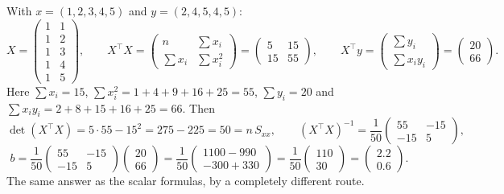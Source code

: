 \documentclass[11pt]{article}
\begin{document}
\begin{worked}
With $x = (1,2,3,4,5)$ and $y = (2,4,5,4,5)$:
\[
  X = \begin{pmatrix}1&1\\1&2\\1&3\\1&4\\1&5\end{pmatrix},\qquad
  X^{\!\top}\!X = \begin{pmatrix} n & \sum x_i\\ \sum x_i & \sum x_i^2
    \end{pmatrix} = \begin{pmatrix}5 & 15\\ 15 & 55\end{pmatrix},\qquad
  X^{\!\top}y = \begin{pmatrix}\sum y_i\\ \sum x_iy_i\end{pmatrix}
    = \begin{pmatrix}20\\ 66\end{pmatrix}.
\]
Here $\sum x_i = 15$, $\sum x_i^2 = 1+4+9+16+25 = 55$, $\sum y_i = 20$ and
$\sum x_iy_i = 2+8+15+16+25 = 66$. Then
\[
  \det(X^{\!\top}\!X) = 5\cdot55 - 15^2 = 275 - 225 = 50 = n\,S_{xx},
  \qquad
  (X^{\!\top}\!X)^{-1} = \frac{1}{50}\begin{pmatrix}55 & -15\\ -15 & 5
    \end{pmatrix},
\]
\[
  b = \frac{1}{50}\begin{pmatrix}55 & -15\\ -15 & 5\end{pmatrix}
      \begin{pmatrix}20\\66\end{pmatrix}
    = \frac{1}{50}\begin{pmatrix}1100 - 990\\ -300 + 330\end{pmatrix}
    = \frac{1}{50}\begin{pmatrix}110\\ 30\end{pmatrix}
    = \begin{pmatrix}2.2\\ 0.6\end{pmatrix}.
\]
The same answer as the scalar formulas, by a completely different route.
\end{worked}
\end{document}
